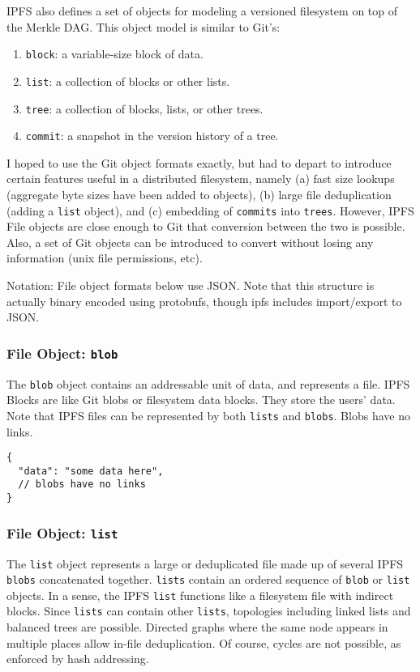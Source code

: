 \documentclass{sig-alternate}
\begin{document}
IPFS also defines a set of objects for modeling a versioned filesystem on top of the Merkle DAG. This object model is similar to Git's:

\begin{enumerate}
  \item \texttt{block}: a variable-size block of data.
  \item \texttt{list}: a collection of blocks or other lists.
  \item \texttt{tree}: a collection of blocks, lists, or other trees.
  \item \texttt{commit}: a snapshot in the version history of a tree.
\end{enumerate}

I hoped to use the Git object formats exactly, but had to depart to introduce certain features useful in a distributed filesystem, namely (a) fast size lookups (aggregate byte sizes have been added to objects), (b) large file deduplication (adding a \texttt{list} object), and (c) embedding of \texttt{commits} into \texttt{trees}. However, IPFS File objects are close enough to Git that conversion between the two is possible. Also, a set of Git objects can be introduced to convert without losing any information (unix file permissions, etc).

Notation: File object formats below use JSON. Note that this structure is actually binary encoded using protobufs, though ipfs includes import/export to JSON.

\subsubsection{File Object: \texttt{blob}}

The \texttt{blob} object contains an addressable unit of data, and
represents a file. IPFS Blocks are like Git blobs or filesystem data blocks. They store the users' data. Note that IPFS files can be represented by both \texttt{lists} and \texttt{blobs}. Blobs have no links.

\begin{verbatim}
{
  "data": "some data here",
  // blobs have no links
}
\end{verbatim}

\subsubsection{File Object: \texttt{list}}

The \texttt{list} object represents a large or deduplicated file made up of
several IPFS \texttt{blobs} concatenated together. \texttt{lists} contain
an ordered sequence of \texttt{blob} or \texttt{list} objects.
In a sense, the IPFS \texttt{list} functions like a filesystem file with
indirect blocks. Since \texttt{lists} can contain other \texttt{lists}, topologies including linked lists and balanced trees are possible. Directed graphs where the same node appears in multiple places allow in-file deduplication. Of course, cycles are not possible, as enforced by hash addressing.
\end{document}
